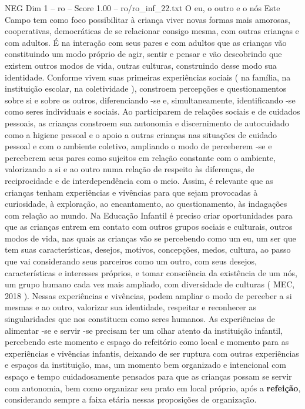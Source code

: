 \begin{textsample}{NEG Dim 1 – ro – Score 1.00 – ro/ro\_inf\_22.txt}  \label{ex:f1_neg_154}
O eu, o outro e o nós Este Campo tem como foco possibilitar à criança viver novas formas mais amorosas, cooperativas, democráticas de se relacionar consigo mesma, com outras crianças e com adultos.
É na interação com seus pares e com adultos que as crianças vão constituindo um modo próprio de agir, sentir e pensar e vão descobrindo que existem outros modos de vida, outras culturas, construindo desse modo sua identidade.
Conforme vivem suas primeiras experiências sociais ( na família, na instituição escolar, na coletividade ), constroem percepções e questionamentos sobre si e sobre os outros, diferenciando -se e, simultaneamente, identificando -se como seres individuais e sociais.
Ao participarem de relações sociais e de cuidados pessoais, as crianças constroem sua autonomia e discernimento de autocuidado como a higiene pessoal e o apoio a outras crianças nas situações de cuidado pessoal e com o ambiente coletivo, ampliando o modo de perceberem -se e perceberem seus pares como sujeitos em relação constante com o ambiente, valorizando a si e ao outro numa relação de respeito às diferenças, de reciprocidade e de interdependência com o meio.
Assim, é relevante que as crianças tenham experiências e vivências para que sejam provocadas à curiosidade, à exploração, ao encantamento, ao questionamento, às indagações com relação ao mundo.
Na Educação Infantil é preciso criar oportunidades para que as crianças entrem em contato com outros grupos sociais e culturais, outros modos de vida, nas quais as crianças vão se percebendo como um eu, um ser que tem suas características, desejos, motivos, concepções, medos, cultura, ao passo que vai considerando seus parceiros como um outro, com seus desejos, características e interesses próprios, e tomar consciência da existência de um nós, um grupo humano cada vez mais ampliado, com diversidade de culturas ( MEC, 2018 ).
Nessas experiências e vivências, podem ampliar o modo de perceber a si mesmas e ao outro, valorizar sua identidade, respeitar e reconhecer as singularidades que nos constituem como seres humanos.
As experiências de alimentar -se e servir -se precisam ter um olhar atento da instituição infantil, percebendo este momento e espaço do refeitório como local e momento para as experiências e vivências infantis, deixando de ser ruptura com outras experiências e espaços da instituição, mas, um momento bem organizado e intencional com espaço e tempo cuidadosamente pensados para que as crianças possam se servir com autonomia, bem como organizar seu prato em local próprio, após a \textbf{refeição}, considerando sempre a faixa etária nessas proposições de organização.

\end{textsample}
